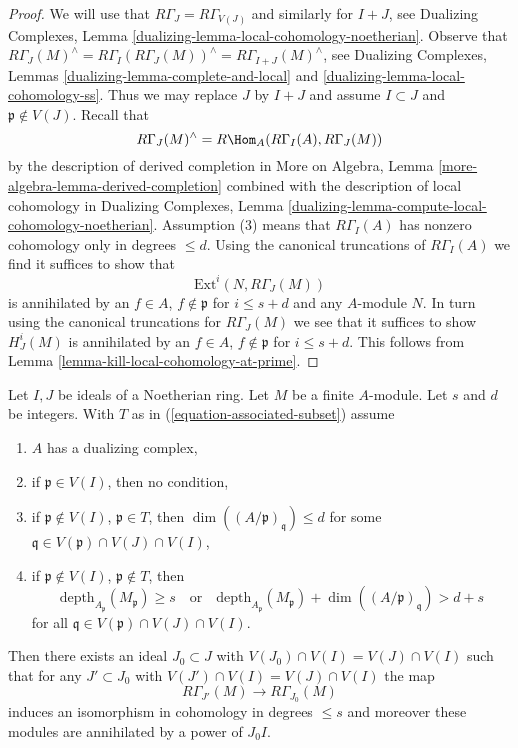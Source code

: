 \begin{proof}
We will use that $R\Gamma_J = R\Gamma_{V(J)}$ and similarly for
$I + J$, see
Dualizing Complexes, Lemma \ref{dualizing-lemma-local-cohomology-noetherian}.
Observe that
$R\Gamma_J(M)^\wedge = R\Gamma_I(R\Gamma_J(M))^\wedge =
R\Gamma_{I + J}(M)^\wedge$, see
Dualizing Complexes, Lemmas
\ref{dualizing-lemma-complete-and-local} and
\ref{dualizing-lemma-local-cohomology-ss}.
Thus we may replace $J$ by $I + J$ and assume $I \subset J$
and $\mathfrak p \not \in V(J)$.
Recall that
$$
R\Gamma_J(M)^\wedge = R\Hom_A(R\Gamma_I(A), R\Gamma_J(M))
$$
by the description of derived completion in
More on Algebra, Lemma \ref{more-algebra-lemma-derived-completion}
combined with the description of local cohomology in
Dualizing Complexes, Lemma
\ref{dualizing-lemma-compute-local-cohomology-noetherian}.
Assumption (3) means that $R\Gamma_I(A)$ has nonzero cohomology
only in degrees $\leq d$. Using the canonical truncations of
$R\Gamma_I(A)$ we find it suffices to show that
$$
\text{Ext}^i(N, R\Gamma_J(M))
$$
is annihilated by an $f \in A$, $f \not \in \mathfrak p$ for
$i \leq s + d$ and any $A$-module $N$.
In turn using the canonical truncations for $R\Gamma_J(M)$
we see that it suffices to show
$H^i_J(M)$ is annihilated by an $f \in A$, $f \not \in \mathfrak p$
for $i \leq s + d$.
This follows from Lemma \ref{lemma-kill-local-cohomology-at-prime}.
\end{proof}

\begin{lemma}
\label{lemma-kill-colimit-weak-general}
Let $I, J$ be ideals of a Noetherian ring. Let $M$ be a finite $A$-module.
Let $s$ and $d$ be integers. With $T$ as in
(\ref{equation-associated-subset}) assume
\begin{enumerate}
\item $A$ has a dualizing complex,
\item if $\mathfrak p \in V(I)$, then no condition,
\item if $\mathfrak p \not \in V(I)$, $\mathfrak p \in T$, then
$\dim((A/\mathfrak p)_\mathfrak q) \leq d$ for some
$\mathfrak q \in V(\mathfrak p) \cap V(J) \cap V(I)$,
\item if $\mathfrak p \not \in V(I)$, $\mathfrak p \not \in T$, then
$$
\text{depth}_{A_\mathfrak p}(M_\mathfrak p) \geq s
\quad\text{or}\quad
\text{depth}_{A_\mathfrak p}(M_\mathfrak p) +
\dim((A/\mathfrak p)_\mathfrak q) > d + s
$$
for all $\mathfrak q \in V(\mathfrak p) \cap V(J) \cap V(I)$.
\end{enumerate}
Then there exists an ideal $J_0 \subset J$ with
$V(J_0) \cap V(I) = V(J) \cap V(I)$ such that for any $J' \subset J_0$ with
$V(J') \cap V(I) = V(J) \cap V(I)$ the map
$$
R\Gamma_{J'}(M) \longrightarrow R\Gamma_{J_0}(M)
$$
induces an isomorphism in cohomology in degrees $\leq s$
and moreover these modules are annihilated by a power of $J_0I$.
\end{lemma}

